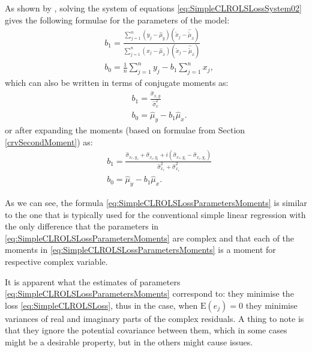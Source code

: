 \documentclass[
]{book}
\begin{document}
As shown by \citet{Svetunkov2012}, solving the system of equations \eqref{eq:SimpleCLROLSLossSystem02} gives the following formulae for the parameters of the model:
\begin{equation}
    \begin{aligned}
        & b_{1} = \frac{\sum_{j=1}^n (y_{j}-\hat{\mu}_{y}) (\tilde{x}_j-\hat{\tilde{\mu}}_{x})}{\sum_{j=1}^n (x_{j}-\hat{\mu}_{x}) (\tilde{x}_j-\hat{\tilde{\mu}}_{x})} \\
        & b_0 = \frac{1}{n} \sum_{j=1}^n y_j - b_1 \sum_{j=1}^n x_j ,
    \end{aligned}
    \label{eq:SimpleCLROLSLossParameters}
\end{equation}
which can also be written in terms of conjugate moments as:
\begin{equation}
    \begin{aligned}
        & b_{1} = \frac{\hat{\sigma}_{x,y}}{\hat{\sigma}_x^2} \\
        & b_0 = \hat{\mu}_{y} - b_1 \hat{\mu}_{x} .
    \end{aligned}
    \label{eq:SimpleCLROLSLossParametersMoments}
\end{equation}
or after expanding the moments (based on formulae from Section \ref{crvSecondMoment}) as:
\begin{equation}
    \begin{aligned}
        & b_{1} = \frac{\hat{\sigma}_{x_r, y_r} + \hat{\sigma}_{x_i, y_i} + i (\hat{\sigma}_{x_r, y_i} - \hat{\sigma}_{x_i, y_r})}{\hat{\sigma}_{x_r}^2 + \hat{\sigma}_{x_i}^2} \\
        & b_0 = \hat{\mu}_{y} - b_1 \hat{\mu}_{x} .
    \end{aligned}
    \label{eq:SimpleCLROLSLossParametersMomentsExpanded}
\end{equation}

As we can see, the formula \eqref{eq:SimpleCLROLSLossParametersMoments} is similar to the one that is typically used for the conventional simple linear regression with the only difference that the parameters in \eqref{eq:SimpleCLROLSLossParametersMoments} are complex and that each of the moments in \eqref{eq:SimpleCLROLSLossParametersMoments} is a moment for respective complex variable.

It is apparent what the estimates of parameters \eqref{eq:SimpleCLROLSLossParametersMoments} correspond to: they minimise the loss \eqref{eq:SimpleCLROLSLoss}, thus in the case, when \(\mathrm{E}(e_j)=0\) they minimise variances of real and imaginary parts of the complex residuals. A thing to note is that they ignore the potential covariance between them, which in some cases might be a desirable property, but in the others might cause issues.
\end{document}
